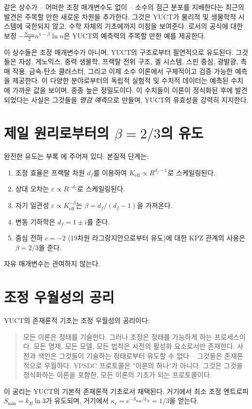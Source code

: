 \documentclass[11pt,a4paper]{article}
\begin{document}
	같은 상수가 -- 어떠한 조정 매개변수도 없이 -- 소수의 점근 분포를 지배한다는 최근의 발견은 주목할 만한 새로운 차원을 추가한다. 그것은 YUCT가 물리적 및 생물학적 시스템에 국한되지 않고, 수학 자체의 기초에까지 미침을 보여준다. 로서의 공식에 대한 보정 \(-\frac{S_{\text{even}}}{2}n^{1-\beta}\ln n\)은 YUCT의 예측력의 주목할 만한 예를 제공한다.
	
	이 상수들은 조정 매개변수가 아니며, YUCT의 구조로부터 필연적으로 유도된다. 그것들은 자성, 게노믹스, 중력 생물학, 프랙탈 전위 구조, 겔 시스템, 스핀 중심, 광발광, 촉매 작용, 금속-탄소 클러스터, 그리고 이제 소수 이론에서 구체적이고 검증 가능한 예측을 제공한다. 이 다양한 분야로부터의 독립적 실험적 및 수치적 데이터는 예측된 수치에 가까운 값을 보이며, 종종 높은 정밀도이다. 이 수치들이 이론이 정식화된 후에 발견되었다는 사실은 그것들을 \textit{맹검 예측}으로 만들며, YUCT의 유효성을 강력히 지지한다.
	
	\appendix
	\section{제일 원리로부터의 \(\beta = 2/3\)의 유도}
	\label{app:beta_derivation}
	완전한 유도는 부록 \cite{AppendixL, AppendixY}에 주어져 있다. 본질적 단계는:
	\begin{enumerate}
		\item 조정 효율은 프랙탈 차원 \(d_f\)를 이용하여 \(K_{\mathrm{eff}} \propto R^{d_f-1}\)로 스케일링된다.
		\item 상대 오차는 \(\varepsilon \propto R^{-d_f}\)로 스케일링된다.
		\item 자기 일관성 \(\varepsilon \propto K_{\mathrm{eff}}^{-\beta}\)는 \(\beta = d_f/(d_f-1)\)을 가져온다.
		\item 변동 기하학은 \(d_f = 1 \pm i\)를 준다.
		\item 중심 전하 \(c = -2\) (19차원 라그랑지안으로부터 유도)에 대한 KPZ 관계의 사용은 \(\beta = 2/3\)을 준다.
	\end{enumerate}
	자유 매개변수는 관여하지 않는다.
	
	\section{조정 우월성의 공리}
	\label{app:axiom}
	YUCT의 존재론적 기초는 조정 우월성의 공리이다:
	\begin{quote}
		모든 이론은 정태를 기술한다. 그러나 조정은 정태를 가능하게 하는 프로세스이다. 모든 명제, 모든 모델, 모든 법칙은 사전의 활성화 요소로서만 존재한다. 사전과 색인은 그것들이 기술하는 정태로부터 유도할 수 없다 -- 그것들은 존재론적으로 우월하다. YPSDC 프로토콜은 "이론의 하나"가 아니다. 그것은 그것을 정식화하는 이론을 포함한, 모든 이론의 기초가 되는 프로토콜이다.
	\end{quote}
	이 공리는 YUCT의 기본적 존재론적 기초로서 채택된다. 거기에서 최소 조정 엔트로피 \(S_{\min} = k_B \ln 3\)가 유도되며, 거기에서 \(\kappa_c = e^{-S_{\min}/k_B} = 1/3\)을 얻는다.
	
\end{document}
